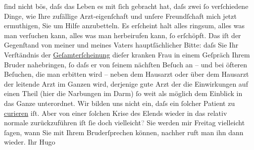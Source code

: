 \begin{ledgroupsized}[t]{13cm}
               ſind nicht bös, daſs das Leben es mit {\pb}ſich gebracht hat, daſs zwei ſo
               verſchiedene Dinge, wie Ihre zufällige Arzt-eigenſchaft und unſere Freundſchaft mich
               jetzt ermuthigen, Sie um Hilfe anzubetteln. Es erſcheint halt alles ringsum, alles
               was man verſuchen kann, alles was man herbeirufen kann, ſo erſchöpft.\pend
           \pstart
           Das iſt der Gegenſtand von meiner und meines Vaters hauptſächlicher Bitte: daſs Sie {\pb}Ihr Verſtändnis der \uline{Geſamterſcheinung} dieſer kranken Frau in einem Geſpräch Ihrem Bruder nahebringen, ſo daſs er von ſeinem
               nächſten Beſuch an – und bei öfteren Beſuchen, die man erbitten wird – neben dem Hausarzt oder über
               dem Hausarzt der
               leitende Arzt im Ganzen wird, derjenige gute Arzt der die Einwirkungen {\pb}auf einen Theil (hier die
               Narbungen im Darm) ſo weit als möglich dem Einblick in das Ganze unterordnet.\pend
           \pstart
           Wir bilden uns nicht ein, daſs ein ſolcher Patient zu \uline{curieren} iſt. Aber von einer ſolchen Krise des Elends wieder in das relativ
               normale zurückzuführen iſt ſie doch vielleicht\textcolor{gray}{?} Sie werden mir
                  Freitag vielleicht ſagen, wann Sie mit Ihrem Bruderſprechen können, nachher ruft man ihn dann wieder.
               Ihr \spacefill\mbox{Hugo}\pend
           \endnumbering{}\end{ledgroupsized}  \newcommand{\dateiname}{L01384}\newcommand{\titel}{Hugo von Hofmannsthal an Arthur Schnitzler, [15. 3. 1904]}\newcommand{\editorInnen}{Martin Anton Müller und Gerd-Hermann Susen}
      